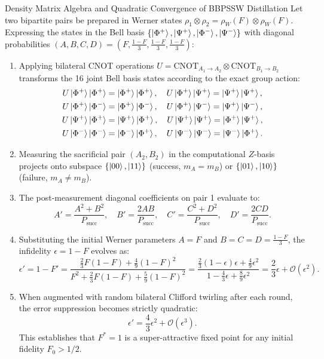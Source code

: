 \begin{theorembox}{Density Matrix Algebra and Quadratic Convergence of BBPSSW Distillation}
Let two bipartite pairs be prepared in Werner states $\rho_1 \otimes \rho_2 = \rho_W(F) \otimes \rho_W(F)$. Expressing the states in the Bell basis $\{\ket{\Phi^+}, \ket{\Psi^+}, \ket{\Phi^-}, \ket{\Psi^-}\}$ with diagonal probabilities $(A, B, C, D) = (F, \frac{1-F}{3}, \frac{1-F}{3}, \frac{1-F}{3})$:
\begin{enumerate}
    \item Applying bilateral CNOT operations $U = \text{CNOT}_{A_1 \to A_2} \otimes \text{CNOT}_{B_1 \to B_2}$ transforms the 16 joint Bell basis states according to the exact group action:
    \begin{align}
        U \ket{\Phi^+}\ket{\Phi^+} &= \ket{\Phi^+}\ket{\Phi^+}, \quad U \ket{\Phi^+}\ket{\Psi^+} = \ket{\Psi^+}\ket{\Psi^+}, \\
        U \ket{\Phi^+}\ket{\Phi^-} &= \ket{\Phi^+}\ket{\Phi^-}, \quad U \ket{\Phi^+}\ket{\Psi^-} = \ket{\Psi^+}\ket{\Psi^-}, \\
        U \ket{\Psi^+}\ket{\Phi^+} &= \ket{\Psi^+}\ket{\Phi^+}, \quad U \ket{\Psi^+}\ket{\Psi^+} = \ket{\Phi^+}\ket{\Psi^+}, \\
        U \ket{\Phi^-}\ket{\Phi^-} &= \ket{\Phi^-}\ket{\Phi^+}, \quad U \ket{\Psi^-}\ket{\Psi^-} = \ket{\Psi^-}\ket{\Phi^+}.
    \end{align}
    \item Measuring the sacrificial pair $(A_2, B_2)$ in the computational $Z$-basis projects onto subspace $\{\ket{00}, \ket{11}\}$ (success, $m_A = m_B$) or $\{\ket{01}, \ket{10}\}$ (failure, $m_A \neq m_B$).
    \item The post-measurement diagonal coefficients on pair 1 evaluate to:
    \begin{equation}
        A' = \frac{A^2 + B^2}{P_{\text{succ}}}, \quad B' = \frac{2AB}{P_{\text{succ}}}, \quad C' = \frac{C^2 + D^2}{P_{\text{succ}}}, \quad D' = \frac{2CD}{P_{\text{succ}}}.
    \end{equation}
    \item Substituting the initial Werner parameters $A = F$ and $B = C = D = \frac{1-F}{3}$, the infidelity $\epsilon = 1 - F$ evolves as:
    \begin{equation}
        \epsilon' = 1 - F' = \frac{\frac{2}{3}F(1-F) + \frac{4}{9}(1-F)^2}{F^2 + \frac{2}{3}F(1-F) + \frac{5}{9}(1-F)^2} = \frac{\frac{2}{3}(1-\epsilon)\epsilon + \frac{4}{9}\epsilon^2}{1 - \frac{4}{3}\epsilon + \frac{8}{9}\epsilon^2} = \frac{2}{3}\epsilon + \mathcal{O}(\epsilon^2).
    \end{equation}
    \item When augmented with random bilateral Clifford twirling after each round, the error suppression becomes strictly quadratic:
    \begin{equation}
        \epsilon' = \frac{4}{3}\epsilon^2 + \mathcal{O}(\epsilon^3).
        \label{eq:quadratic_error_suppression}
    \end{equation}
    This establishes that $F^* = 1$ is a super-attractive fixed point for any initial fidelity $F_0 > 1/2$.
\end{enumerate}
\end{theorembox}

